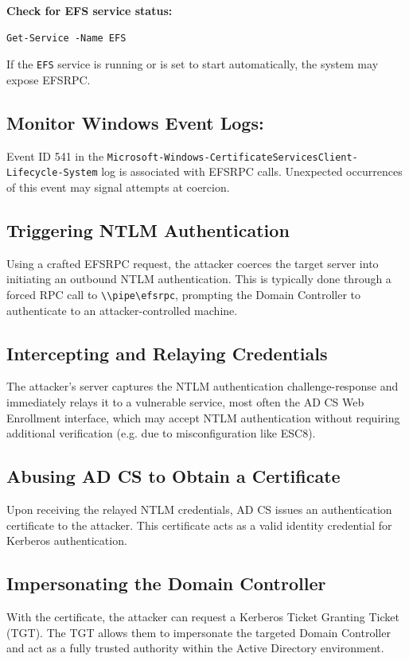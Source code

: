 \textbf{Check for EFS service status:}
    \begin{verbatim}
Get-Service -Name EFS
    \end{verbatim}
If the \texttt{EFS} service is running or is set to start automatically, the system may expose EFSRPC.

\subsection{Monitor Windows Event Logs:}  Event ID 541 in the \texttt{Microsoft-Windows-CertificateServicesClient-Lifecycle-System} log is associated with EFSRPC calls. Unexpected occurrences of this event may signal attempts at coercion.

\subsection*{Triggering NTLM Authentication}
Using a crafted EFSRPC request, the attacker coerces the target server into initiating an outbound NTLM authentication. This is typically done through a forced RPC call to \verb|\\pipe\efsrpc|, prompting the Domain Controller to authenticate to an attacker-controlled machine.

\subsection*{Intercepting and Relaying Credentials}
The attacker's server captures the NTLM authentication challenge-response and immediately relays it to a vulnerable service, most often the AD CS Web Enrollment interface, which may accept NTLM authentication without requiring additional verification (e.g. due to misconfiguration like ESC8).

\subsection*{Abusing AD CS to Obtain a Certificate}
Upon receiving the relayed NTLM credentials, AD CS issues an authentication certificate to the attacker. This certificate acts as a valid identity credential for Kerberos authentication.

\subsection*{Impersonating the Domain Controller}
With the certificate, the attacker can request a Kerberos Ticket Granting Ticket (TGT). The TGT allows them to impersonate the targeted Domain Controller and act as a fully trusted authority within the Active Directory environment.

